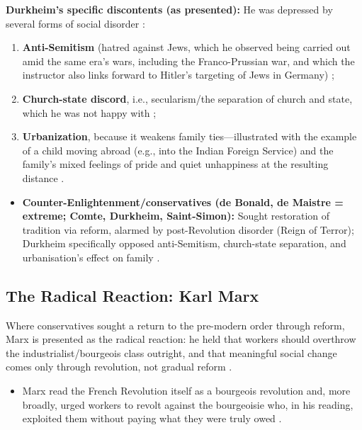 \begin{CriticalPoint}
\textbf{Durkheim's specific discontents (as presented):} He was depressed by several forms of social disorder :
\begin{enumerate}[label=(\roman*)]
    \item \textbf{Anti-Semitism} (hatred against Jews, which he observed being carried out amid the same era's wars, including the Franco-Prussian war, and which the instructor also links forward to Hitler's targeting of Jews in Germany) ;
    \item \textbf{Church-state discord}, i.e., secularism/the separation of church and state, which he was not happy with ;
    \item \textbf{Urbanization}, because it weakens family ties---illustrated with the example of a child moving abroad (e.g., into the Indian Foreign Service) and the family's mixed feelings of pride and quiet unhappiness at the resulting distance .
\end{enumerate}
\end{CriticalPoint}

\begin{QuickRevision}
\begin{itemize}
    \item \textbf{Counter-Enlightenment/conservatives (de Bonald, de Maistre = extreme; Comte, Durkheim, Saint-Simon):} Sought restoration of tradition via reform, alarmed by post-Revolution disorder (Reign of Terror); Durkheim specifically opposed anti-Semitism, church-state separation, and urbanisation's effect on family .
\end{itemize}
\end{QuickRevision}

\subsection{The Radical Reaction: Karl Marx}

\begin{KeyConcept}
Where conservatives sought a return to the pre-modern order through reform, Marx is presented as the radical reaction: he held that workers should overthrow the industrialist/bourgeois class outright, and that meaningful social change comes only through revolution, not gradual reform .
\begin{itemize}
    \item Marx read the French Revolution itself as a bourgeois revolution and, more broadly, urged workers to revolt against the bourgeoisie who, in his reading, exploited them without paying what they were truly owed .
\end{itemize}
\end{KeyConcept}

